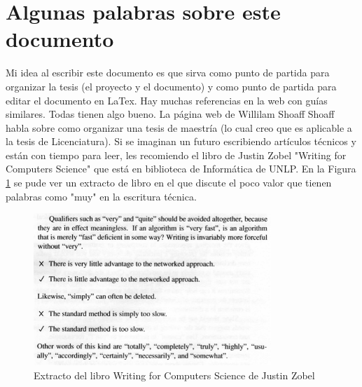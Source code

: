 \section{Algunas palabras sobre este documento}

Mi idea al escribir este documento es que sirva como punto de partida para organizar la tesis (el proyecto y el documento) y como punto de partida para editar el documento en LaTex. Hay muchas referencias en la web con guías similares. Todas tienen algo bueno. La página web de Willilam Shoaff Shoaff \cite{Shoaff} habla sobre como organizar una tesis de maestría (lo cual creo que es aplicable a la tesis de Licenciatura). Si se imaginan un futuro escribiendo artículos técnicos y están con tiempo para leer, les recomiendo el libro de Justin Zobel "Writing for Computers Science" \cite{Zobel04a} que está en biblioteca de Informática de UNLP. En la Figura \ref{zobel-page-46} se pude ver un extracto de libro en el que discute el poco valor que tienen palabras como "muy" en la escritura técnica. 

\begin{figure}
\begin{center}
\includegraphics[width=0.8\textwidth]{00-introduccion/zobel-page-46}
\caption{Extracto del libro Writing for Computers Science de Justin Zobel}
\label{zobel-page-46}
\end{center}
\end{figure}

